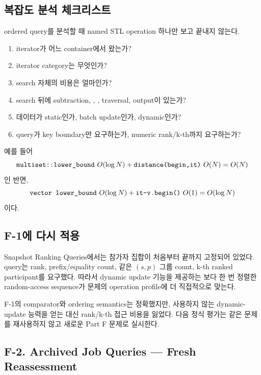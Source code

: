 \subsection{복잡도 분석 체크리스트}

ordered query를 분석할 때 named STL operation 하나만 보고 끝내지 않는다.
\begin{enumerate}
\item iterator가 어느 container에서 왔는가?
\item iterator category는 무엇인가?
\item search 자체의 비용은 얼마인가?
\item search 뒤에 subtraction, , , traversal, output이 있는가?
\item 데이터가 static인가, batch update인가, dynamic인가?
\item query가 key boundary만 요구하는가, numeric rank/k-th까지 요구하는가?
\end{enumerate}

예를 들어
\[
\code{multiset::lower\_bound}\ O(\log N)
+\code{distance(begin,it)}\ O(N)
=O(N)
\]
인 반면,
\[
\texttt{vector lower\_bound}\ O(\log N)
+\texttt{it-v.begin()}\ O(1)
=O(\log N)
\]
이다.

\subsection{F-1에 다시 적용}

Snapshot Ranking Queries에서는 참가자 집합이 처음부터 끝까지 고정되어 있었다. query는 rank, prefix/equality count, 같은 $(s,p)$ 그룹 count, k-th ranked participant를 요구했다. 따라서 dynamic update 기능을 제공하는 보다 한 번 정렬한 random-access sequence가 문제의 operation profile에 더 직접적으로 맞는다.

F-1의 comparator와 ordering semantics는 정확했지만, 사용하지 않는 dynamic-update 능력을 얻는 대신 rank/k-th 접근 비용을 잃었다. 다음 정식 평가는 같은 문제를 재사용하지 않고 새로운 Part F 문제로 실시한다.

\subsection{F-2. Archived Job Queries --- Fresh Reassessment}

